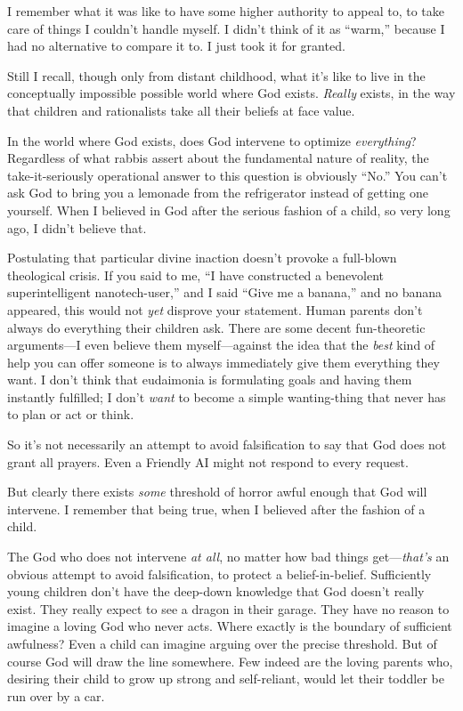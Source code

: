 {
 I remember what it was like to have some higher authority to
appeal to, to take care of things I couldn't handle
myself. I didn't think of it as
``warm,'' because I had no
alternative to compare it to. I just took it for granted.}

{
 Still I recall, though only from distant childhood, what
it's like to live in the conceptually impossible
possible world where God exists. \textit{Really} exists, in the way
that children and rationalists take all their beliefs at face value.}

{
 In the world where God exists, does God intervene to optimize
\textit{everything}? Regardless of what rabbis assert about the
fundamental nature of reality, the take-it-seriously operational answer
to this question is obviously
``No.'' You can't
ask God to bring you a lemonade from the refrigerator instead of
getting one yourself. When I believed in God after the serious fashion
of a child, so very long ago, I didn't believe that.}

{
 Postulating that particular divine inaction
doesn't provoke a full-blown theological crisis. If you
said to me, ``I have constructed a benevolent
superintelligent nanotech-user,'' and I said
``Give me a banana,'' and no banana
appeared, this would not \textit{yet} disprove your statement. Human
parents don't always do everything their children ask.
There are some decent fun-theoretic arguments---I even believe them
myself---against the idea that the \textit{best} kind of help you can
offer someone is to always immediately give them everything they want.
I don't think that eudaimonia is formulating goals and
having them instantly fulfilled; I don't \textit{want}
to become a simple wanting-thing that never has to plan or act or
think.}

{
 So it's not necessarily an attempt to avoid
falsification to say that God does not grant all prayers. Even a
Friendly AI might not respond to every request.}

{
 But clearly there exists \textit{some} threshold of horror awful
enough that God will intervene. I remember that being true, when I
believed after the fashion of a child.}

{
 The God who does not intervene \textit{at all}, no matter how bad
things get---\textit{that's} an obvious attempt to
avoid falsification, to protect a belief-in-belief. Sufficiently young
children don't have the deep-down knowledge that God
doesn't really exist. They really expect to see a
dragon in their garage. They have no reason to imagine a loving God who
never acts. Where exactly is the boundary of sufficient awfulness? Even
a child can imagine arguing over the precise threshold. But of course
God will draw the line somewhere. Few indeed are the loving parents
who, desiring their child to grow up strong and self-reliant, would let
their toddler be run over by a car.}

